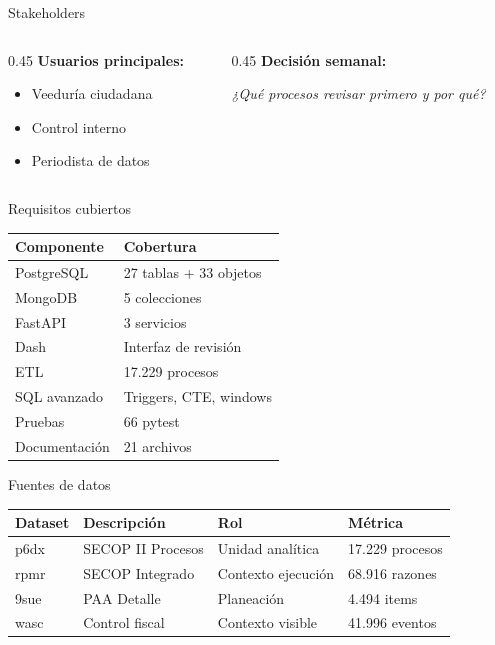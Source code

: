 \documentclass[aspectratio=169,10pt]{beamer}
\begin{document}
\begin{frame}{Stakeholders}
  \begin{columns}[T]
    \begin{column}{0.45\textwidth}
      \textbf{Usuarios principales:}
      \begin{itemize}
        \item Veeduría ciudadana
        \item Control interno
        \item Periodista de datos
      \end{itemize}
    \end{column}
    
    \begin{column}{0.45\textwidth}
      \textbf{Decisión semanal:}
      \begin{center}
        \itshape ¿Qué procesos revisar primero y por qué?
      \end{center}
    \end{column}
  \end{columns}
\end{frame}

\begin{frame}{Requisitos cubiertos}
  \begin{table}
    \centering
    \small
    \begin{tabular}{@{}ll@{}}
      \toprule
      \textbf{Componente} & \textbf{Cobertura} \\
      \midrule
      PostgreSQL & 27 tablas + 33 objetos \\
      MongoDB & 5 colecciones \\
      FastAPI & 3 servicios \\
      Dash & Interfaz de revisión \\
      ETL & 17.229 procesos \\
      SQL avanzado & Triggers, CTE, windows \\
      Pruebas & 66 pytest \\
      Documentación & 21 archivos \\
      \bottomrule
    \end{tabular}
  \end{table}
\end{frame}

\begin{frame}{Fuentes de datos}
  \begin{table}
    \centering
    \small
    \begin{tabular}{@{}llll@{}}
      \toprule
      \textbf{Dataset} & \textbf{Descripción} & \textbf{Rol} & \textbf{Métrica} \\
      \midrule
      p6dx & SECOP II Procesos & Unidad analítica & 17.229 procesos \\
      rpmr & SECOP Integrado & Contexto ejecución & 68.916 razones \\
      9sue & PAA Detalle & Planeación & 4.494 items \\
      wasc & Control fiscal & Contexto visible & 41.996 eventos \\
      \bottomrule
    \end{tabular}
  \end{table}
\end{frame}
\end{document}
